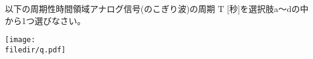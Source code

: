 以下の周期性時間領域アナログ信号(のこぎり波)の周期 $\textrm{T}$ [秒]を選択肢a〜dの中から1つ選びなさい。

\centering\texttt{[image: \\filedir/q.pdf]}

